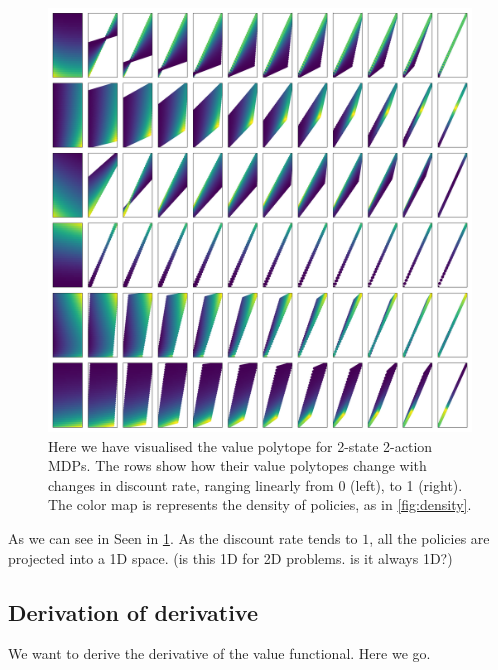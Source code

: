 \begin{figure}
\centering
\includegraphics[width=1\textwidth,height=1\textheight]{../../pictures/figures/discounts.png}
\caption{Here we have visualised the value polytope for 2-state 2-action MDPs. The
rows show how their value polytopes change with changes in discount rate, ranging linearly from 0 (left), to 1 (right).
The color map is represents the density of policies, as in \ref{fig:density}.}
\label{fig:polytope-discounts}
\end{figure}

As we can see in Seen in \ref{fig:polytope-discounts}. As the discount rate tends to $1$,
all the policies are projected into a 1D space. (is this 1D for 2D problems. is it always 1D?)

\subsection{Derivation of derivative}

We want to derive the derivative of the value functional. Here we go.

